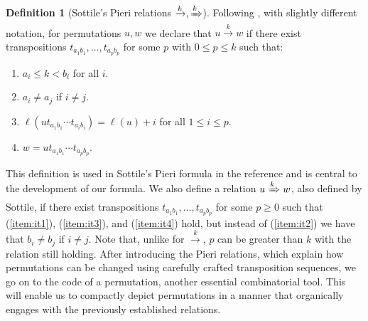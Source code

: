 \documentclass[reqno]{amsart}
\theoremstyle{definition}
\newtheorem{definition}[lemma]{Definition}
\theoremstyle{remark}
\numberwithin{equation}{subsection}
\newcommand{\tom}[1]{\xrightarrow{#1}}
\newcommand{\Tom}[1]{\xRightarrow{#1}}
\begin{document}
	\begin{definition}[Sottile's Pieri relations $\tom{k},\Tom{k}$] \label{definition:pierisymb}
		Following \cite{sottile}, with slightly different notation, for permutations $u,w$ we declare that $u\tom{k} w$ if there exist transpositions $t_{a_1b_1},\ldots, t_{a_pb_p}$ for some $p$ with $0\leq p\leq k$ such that:
		\begin{enumerate}
			\item \label{item:it1} $a_i\leq k<b_i$ for all $i$.
			\item \label{item:it2} $a_i\neq a_j$ if $i\neq j$.
			\item \label{item:it3} $\ell(ut_{a_1b_1}\cdots t_{a_ib_i})=\ell(u)+i$ for all $1\leq i\leq p$.
			\item \label{item:it4} $w=ut_{a_1b_1}\cdots t_{a_pb_p}$.
		\end{enumerate}
		This definition is used in Sottile's Pieri formula in the reference and is central to the development of our formula. We also define a relation $u\Tom{k} w$, also defined by Sottile, if there exist transpositions $t_{a_1b_1},\ldots,t_{a_pb_p}$ for some $p\geq 0$ such that (\ref{item:it1}), (\ref{item:it3}), and (\ref{item:it4}) hold, but instead of (\ref{item:it2}) we have that $b_i\neq b_j$ if $i\neq j$. Note that, unlike for $\tom{k}$, $p$ can be greater than $k$ with the relation still holding.
        After introducing the Pieri relations, which explain how permutations can be changed using carefully crafted transposition sequences, we go on to the code of a permutation, another essential combinatorial tool.  This will enable us to compactly depict permutations in a manner that organically engages with the previously established relations.

	\end{definition}
	
	
	
\end{document}
